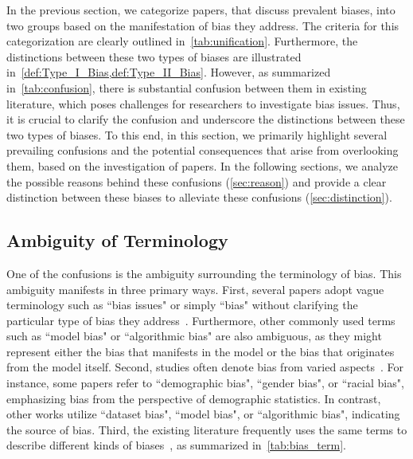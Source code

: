 \label{sec:confusion}

In the previous section, we categorize \pc papers, that discuss prevalent biases, into two groups based on the manifestation of bias they address.
The criteria for this categorization are clearly outlined in~\cref{tab:unification}. 
Furthermore, the distinctions between these two types of biases are illustrated in~\cref{def:Type_I_Bias,def:Type_II_Bias}.
However, as summarized in~\cref{tab:confusion}, there is substantial confusion between them in existing literature, which poses challenges for researchers to investigate bias issues. 
Thus, it is crucial to clarify the confusion and underscore the distinctions between these two types of biases.
To this end, in this section, we primarily highlight several prevailing confusions and the potential consequences that arise from overlooking them, based on the investigation of \pc papers.
In the following sections, we analyze the possible reasons behind these confusions (\cref{sec:reason}) and provide a clear distinction between these biases to alleviate these confusions (\cref{sec:distinction}).

















\subsection{Ambiguity of Terminology}
One of the confusions is the ambiguity surrounding the terminology of bias.
This ambiguity manifests in three primary ways.
First, several papers adopt vague terminology such as ``bias issues" or simply ``bias" without clarifying the particular type of bias they address~\cite{DI}.
Furthermore, other commonly used terms such as ``model bias" or ``algorithmic bias" are also ambiguous, as they might represent either the bias that manifests in the model or the bias that originates from the model itself. 
Second, studies often denote bias from varied aspects~\cite{hirota2022gender, markl2022language}.
For instance, some papers refer to ``demographic bias", ``gender bias", or ``racial bias", emphasizing bias from the perspective of demographic statistics.
In contrast, other works utilize ``dataset bias", ``model bias", or ``algorithmic bias", indicating the source of bias.
Third, the existing literature frequently uses the same terms to describe different kinds of biases~\cite{MvCoM, Back_MI}, as summarized in~\cref{tab:bias_term}.


